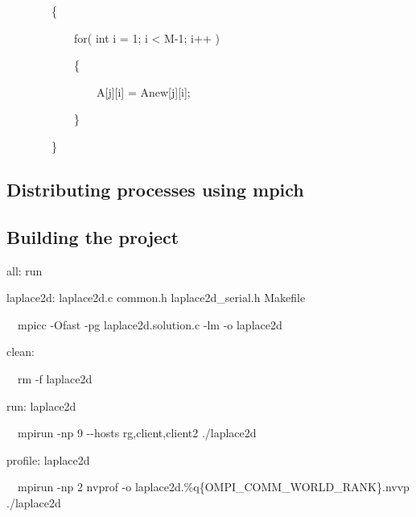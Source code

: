\documentclass[a4paper]{article}
\begin{document}
\ \ \ \ \ \ \ \ \{

\ \ \ \ \ \ \ \ \ \ \ \ for( int i = 1; i {\textless} M-1; i++ )

\ \ \ \ \ \ \ \ \ \ \ \ \{

\ \ \ \ \ \ \ \ \ \ \ \ \ \ \ \ A[j][i] = Anew[j][i];

\ \ \ \ \ \ \ \ \ \ \ \ \}

\ \ \ \ \ \ \ \ \}

\subsection[Distributing processes using mpich]{\rmfamily Distributing processes using mpich}
\subsection[Building the project]{\rmfamily Building the project}
all: run

laplace2d: laplace2d.c common.h laplace2d\_serial.h Makefile

\ \ mpicc -Ofast -pg laplace2d.solution.c -lm -o laplace2d 

clean:

\ \ rm -f laplace2d

run: laplace2d

\ \ mpirun -np 9 -{}-hosts rg,client,client2 ./laplace2d

profile: laplace2d

\ \ mpirun -np 2 nvprof -o laplace2d.\%q\{OMPI\_COMM\_WORLD\_RANK\}.nvvp ./laplace2d


\bigskip


\bigskip

\section[]{}

\bigskip


\bigskip


\bigskip


\bigskip


\bigskip


\bigskip


\bigskip


\bigskip


\bigskip


\bigskip


\bigskip


\bigskip


\bigskip
\end{document}
